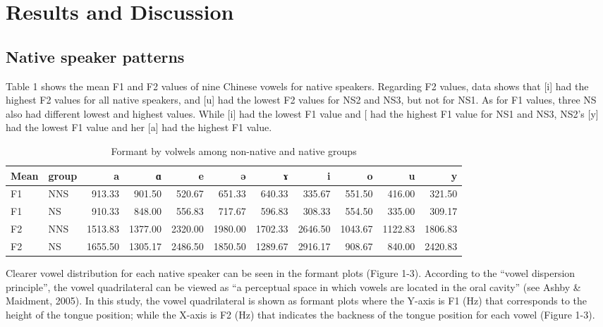 \documentclass[man, fleqn, noextraspace]{apa6}
\begin{document}
\section{Results and Discussion}\label{results-and-discussion}

\subsection{Native speaker patterns}\label{native-speaker-patterns}

Table 1 shows the mean F1 and F2 values of nine Chinese vowels for
native speakers. Regarding F2 values, data shows that {[}i{]} had the
highest F2 values for all native speakers, and {[}u{]} had the lowest F2
values for NS2 and NS3, but not for NS1. As for F1 values, three NS also
had different lowest and highest values. While {[}i{]} had the lowest F1
value and {[}\ipatext{ɑ}{]} had the highest F1 value for NS1 and NS3,
NS2's {[}y{]} had the lowest F1 value and her {[}a{]} had the highest F1
value.

\begin{table}

\caption{\label{tab:table1}Formant by volwels among non-native and native groups}
\centering
\begin{tabular}[t]{llrrrrrrrrr}
\toprule
Mean & group & a & ɑ & e & ə & ɤ & i & o & u & y\\
\midrule
F1 & NNS & 913.33 & 901.50 & 520.67 & 651.33 & 640.33 & 335.67 & 551.50 & 416.00 & 321.50\\
F1 & NS & 910.33 & 848.00 & 556.83 & 717.67 & 596.83 & 308.33 & 554.50 & 335.00 & 309.17\\
F2 & NNS & 1513.83 & 1377.00 & 2320.00 & 1980.00 & 1702.33 & 2646.50 & 1043.67 & 1122.83 & 1806.83\\
F2 & NS & 1655.50 & 1305.17 & 2486.50 & 1850.50 & 1289.67 & 2916.17 & 908.67 & 840.00 & 2420.83\\
\bottomrule
\end{tabular}
\end{table}

Clearer vowel distribution for each native speaker can be seen in the
formant plots (Figure 1-3). According to the ``vowel dispersion
principle'', the vowel quadrilateral can be viewed as ``a perceptual
space in which vowels are located in the oral cavity'' (see Ashby \&
Maidment, 2005). In this study, the vowel quadrilateral is shown as
formant plots where the Y-axis is F1 (Hz) that corresponds to the height
of the tongue position; while the X-axis is F2 (Hz) that indicates the
backness of the tongue position for each vowel (Figure 1-3).
\end{document}
